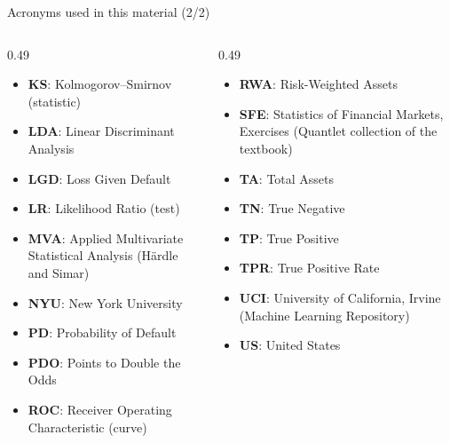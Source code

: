 \begin{frame}{Acronyms used in this material (2/2)}
\begin{columns}[T]
\begin{column}{0.49\textwidth}
\begin{itemize}\setlength{\itemsep}{0pt}
    \item \textbf{KS}: Kolmogorov–Smirnov (statistic)
    \item \textbf{LDA}: Linear Discriminant Analysis
    \item \textbf{LGD}: Loss Given Default
    \item \textbf{LR}: Likelihood Ratio (test)
    \item \textbf{MVA}: Applied Multivariate Statistical Analysis (Härdle and Simar)
    \item \textbf{NYU}: New York University
    \item \textbf{PD}: Probability of Default
    \item \textbf{PDO}: Points to Double the Odds
    \item \textbf{ROC}: Receiver Operating Characteristic (curve)
\end{itemize}
\end{column}
\begin{column}{0.49\textwidth}
\begin{itemize}\setlength{\itemsep}{0pt}
    \item \textbf{RWA}: Risk-Weighted Assets
    \item \textbf{SFE}: Statistics of Financial Markets, Exercises (Quantlet collection of the textbook)
    \item \textbf{TA}: Total Assets
    \item \textbf{TN}: True Negative
    \item \textbf{TP}: True Positive
    \item \textbf{TPR}: True Positive Rate
    \item \textbf{UCI}: University of California, Irvine (Machine Learning Repository)
    \item \textbf{US}: United States
\end{itemize}
\end{column}
\end{columns}
\end{frame}

